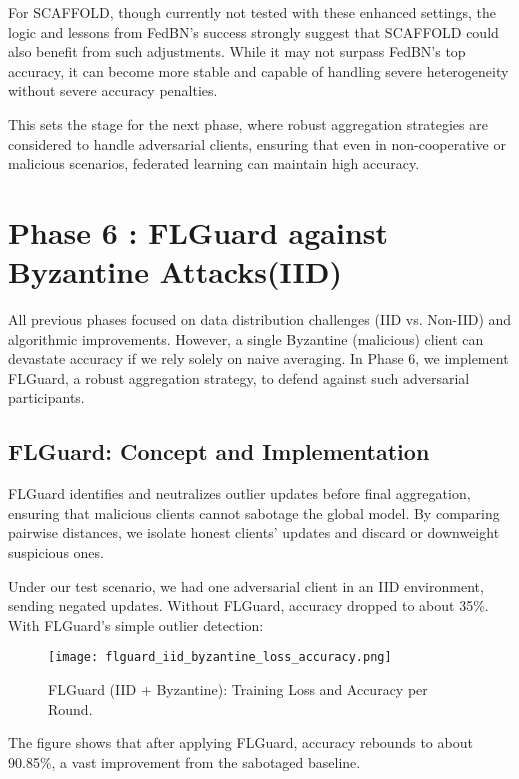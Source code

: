 \documentclass[12pt,a4paper]{report}
\begin{document}
For SCAFFOLD, though currently not tested with these enhanced settings, the logic and lessons from FedBN’s success strongly suggest that SCAFFOLD could also benefit from such adjustments. While it may not surpass FedBN’s top accuracy, it can become more stable and capable of handling severe heterogeneity without severe accuracy penalties.

This sets the stage for the next phase, where robust aggregation strategies are considered to handle adversarial clients, ensuring that even in non-cooperative or malicious scenarios, federated learning can maintain high accuracy.

\chapter*{Phase 6 : FLGuard against Byzantine Attacks(IID)}

All previous phases focused on data distribution challenges (IID vs. Non-IID) and algorithmic improvements. However, a single Byzantine (malicious) client can devastate accuracy if we rely solely on naive averaging. In Phase 6, we implement FLGuard, a robust aggregation strategy, to defend against such adversarial participants.

\section{FLGuard: Concept and Implementation}

FLGuard identifies and neutralizes outlier updates before final aggregation, ensuring that malicious clients cannot sabotage the global model. By comparing pairwise distances, we isolate honest clients’ updates and discard or downweight suspicious ones.

Under our test scenario, we had one adversarial client in an IID environment, sending negated updates. Without FLGuard, accuracy dropped to about 35\%. With FLGuard’s simple outlier detection:

\begin{figure}[H]
	\centering
	\texttt{[image: flguard\_iid\_byzantine\_loss\_accuracy.png]}
	\caption{FLGuard (IID + Byzantine): Training Loss and Accuracy per Round.}
\end{figure}

The figure shows that after applying FLGuard, accuracy rebounds to about 90.85\%, a vast improvement from the sabotaged baseline.
\end{document}
